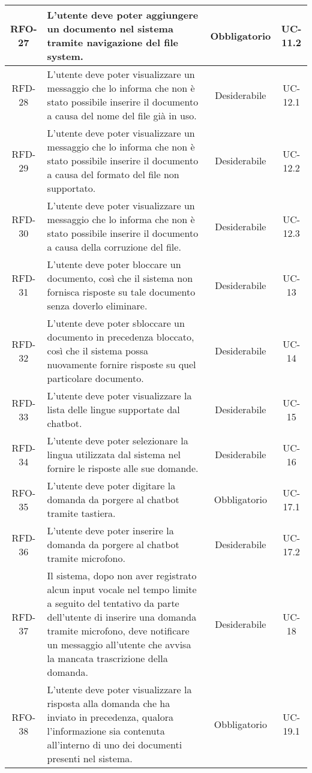 \begin{xltabular}{\textwidth}{| c | X | c | c |}
    \hline
    RFO-27 & L’utente deve poter aggiungere un documento nel sistema tramite navigazione del file system. & Obbligatorio & UC-11.2 \\
    \hline
    RFD-28 & L'utente deve poter visualizzare un messaggio che lo informa che non è stato possibile inserire il documento a causa del nome del file già in uso. & Desiderabile & UC-12.1 \\
    \hline
    RFD-29 & L'utente deve poter visualizzare un messaggio che lo informa che non è stato possibile inserire il documento a causa del formato del file non supportato. & Desiderabile & UC-12.2 \\
    \hline
    RFD-30 & L'utente deve poter visualizzare un messaggio che lo informa che non è stato possibile inserire il documento a causa della corruzione del file. & Desiderabile & UC-12.3 \\
    \hline
    RFD-31 & L’utente deve poter bloccare un documento, così che il sistema non fornisca risposte su tale documento senza doverlo eliminare. & Desiderabile & UC-13 \\
    \hline
    RFD-32 & L’utente deve poter sbloccare un documento in precedenza bloccato, così che il sistema possa nuovamente fornire risposte su quel particolare documento. & Desiderabile & UC-14 \\
    \hline
    RFD-33 & L’utente deve poter visualizzare la lista delle lingue supportate dal chatbot. & Desiderabile & UC-15 \\
    \hline
    RFD-34 & L’utente deve poter selezionare la lingua utilizzata dal sistema nel fornire le risposte alle sue domande. & Desiderabile & UC-16 \\
    \hline
    RFO-35 & L’utente deve poter digitare la domanda da porgere al chatbot tramite tastiera. & Obbligatorio & UC-17.1 \\
    \hline
    RFD-36 & L’utente deve poter inserire la domanda da porgere al chatbot tramite microfono. & Desiderabile & UC-17.2 \\
    \hline
    RFD-37 & Il sistema, dopo non aver registrato alcun input vocale nel tempo limite a seguito del tentativo da parte dell'utente di inserire una domanda tramite microfono, deve notificare un messaggio all'utente che avvisa la mancata trascrizione della domanda. & Desiderabile & UC-18 \\
    \hline
    RFO-38 & L’utente deve poter visualizzare la risposta alla domanda che ha inviato in precedenza, qualora l'informazione sia contenuta all'interno di uno dei documenti presenti nel sistema. & Obbligatorio & UC-19.1 \\

\end{xltabular}
